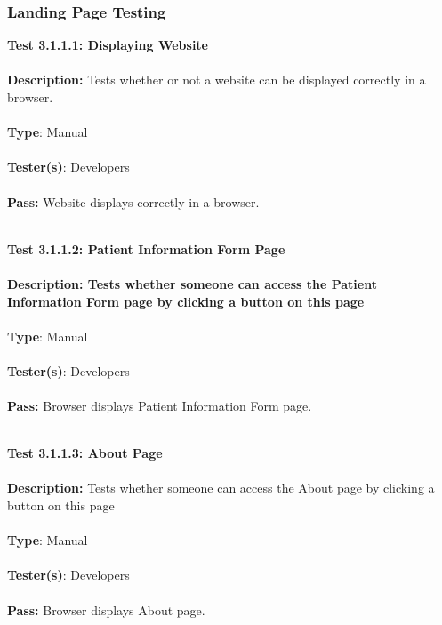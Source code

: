 \documentclass[12pt]{article}
\begin{document}
\subsubsection{Landing Page Testing}
\begin{tcolorbox}
\textbf{Test 3.1.1.1: Displaying Website} \\ \\
\textbf{Description:} Tests whether or not a website can be displayed correctly in a browser. \\ \\
\textbf{Type}: Manual \\ \\
\textbf{Tester(s)}: Developers \\ \\
\textbf{Pass:} Website displays correctly in a browser. \\ \\
\end{tcolorbox}

\begin{tcolorbox}
\textbf{Test 3.1.1.2: Patient Information Form Page} \\ \\
\textbf{Description: Tests whether someone can access the Patient Information Form page by clicking a button on this page} \\ \\
\textbf{Type}: Manual \\ \\
\textbf{Tester(s)}: Developers \\ \\
\textbf{Pass:} Browser displays Patient Information Form page.  \\ \\
\end{tcolorbox}

\begin{tcolorbox}
\textbf{Test 3.1.1.3: About Page} \\ \\
\textbf{Description:} Tests whether someone can access the About page by clicking a button on this page \\ \\
\textbf{Type}: Manual \\ \\
\textbf{Tester(s)}: Developers \\ \\
\textbf{Pass:} Browser displays About page. \\ \\
\end{tcolorbox}
\end{document}
